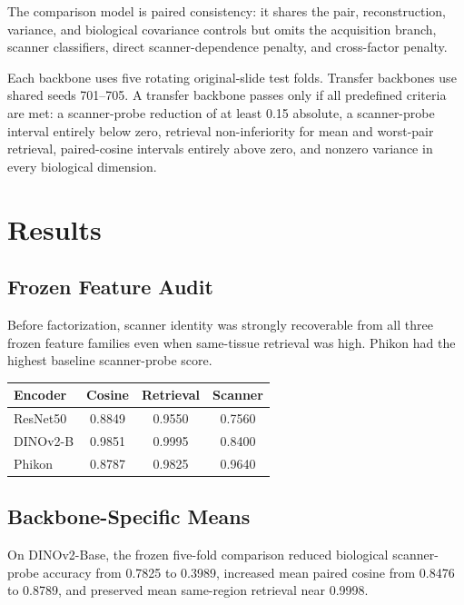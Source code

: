 \documentclass[10pt]{article}
\begin{document}
The comparison model is paired consistency: it shares the pair, reconstruction, variance, and biological covariance controls but omits the acquisition branch, scanner classifiers, direct scanner-dependence penalty, and cross-factor penalty.

Each backbone uses five rotating original-slide test folds. Transfer backbones use shared seeds 701--705. A transfer backbone passes only if all predefined criteria are met: a scanner-probe reduction of at least 0.15 absolute, a scanner-probe interval entirely below zero, retrieval non-inferiority for mean and worst-pair retrieval, paired-cosine intervals entirely above zero, and nonzero variance in every biological dimension.

\section{Results}
\subsection{Frozen Feature Audit}
Before factorization, scanner identity was strongly recoverable from all three frozen feature families even when same-tissue retrieval was high. Phikon had the highest baseline scanner-probe score.

\begin{center}
\centering
{}
\scriptsize
\setlength{\tabcolsep}{2.6pt}
\begin{tabular}{@{}lccc@{}}
\toprule
Encoder & Cosine & Retrieval & Scanner \\
\midrule
ResNet50 & 0.8849 & 0.9550 & 0.7560 \\
DINOv2-B & 0.9851 & 0.9995 & 0.8400 \\
Phikon & 0.8787 & 0.9825 & 0.9640 \\
\bottomrule
\end{tabular}
\label{tab:frozen_audit}
\end{center}

\subsection{Backbone-Specific Means}
On DINOv2-Base, the frozen five-fold comparison reduced biological scanner-probe accuracy from 0.7825 to 0.3989, increased mean paired cosine from 0.8476 to 0.8789, and preserved mean same-region retrieval near 0.9998.
\end{document}

